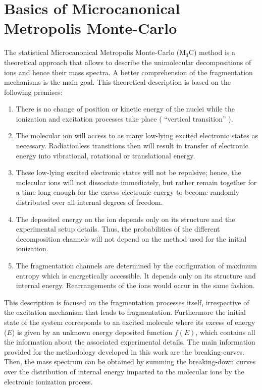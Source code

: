 \documentclass[a4paper,12pt]{article}
\begin{document}
\section{Basics of Microcanonical Metropolis Monte-Carlo }

The statistical Microcanonical Metropolis Monte-Carlo (M$_3$C) method is a theoretical approach that 
allows to describe the unimolecular decompositions
of ions and hence their mass spectra. A better comprehension of the fragmentation mechanisms is the main goal.
This theoretical description is based on the following premises:
\begin{enumerate}
\item There is no change of position or kinetic energy of the nuclei while the ionization and excitation processes take place ( ``vertical transition'' ).
\item The molecular ion will access to as many low-lying excited electronic states as necessary. Radiationless transitions then will result in
transfer of electronic energy into vibrational, rotational or translational energy.
\item These low-lying excited electronic states will not be repulsive; hence, the molecular ions will not dissociate immediately,
but rather remain together for a time long enough for the excess electronic energy to become randomly distributed over all internal degrees of freedom.

\item The deposited energy on the ion depends only on its structure and the experimental setup details.
Thus, the probabilities of the different decomposition channels will not depend on the method used for the initial ionization.

\item The fragmentation channels are determined by the configuration of maximum entropy which is energetically accessible.
It depends only on its structure and internal energy.
Rearrangements of the ions would occur in the same fashion.
\end{enumerate}

This description is focused on the fragmentation processes itself, irrespective
of the excitation mechanism that leads to fragmentation. Furthermore the initial state of the system corresponds
to an excited molecule where its excess of energy ($E$) is given by an unknown energy deposited function $f(E)$, which contains
all the information about the associated experimental details.
The main information provided for the methodology developed in this work are the breaking-curves. Then, the mass spectrum can be obtained by summing the breaking-down curves over the distribution of internal energy imparted to the molecular ions by the electronic ionization process.
\end{document}
